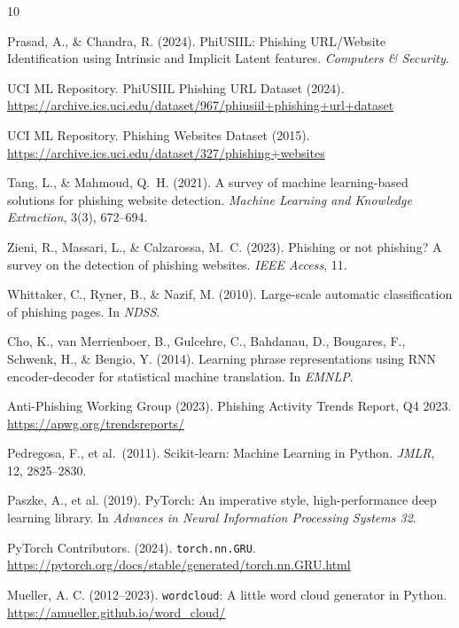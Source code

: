 \documentclass{article}
\begin{document}
\newpage
\begin{thebibliography}{10}
\small

Prasad, A., \& Chandra, R. (2024).
PhiUSIIL: Phishing URL/Website Identification using Intrinsic and Implicit Latent features.
\textit{Computers \& Security}.

UCI ML Repository. PhiUSIIL Phishing URL Dataset (2024).
\url{https://archive.ics.uci.edu/dataset/967/phiusiil+phishing+url+dataset}

UCI ML Repository. Phishing Websites Dataset (2015).
\url{https://archive.ics.uci.edu/dataset/327/phishing+websites}

Tang, L., \& Mahmoud, Q.~H. (2021).
A survey of machine learning-based solutions for phishing website detection.
\textit{Machine Learning and Knowledge Extraction}, 3(3), 672--694.

Zieni, R., Massari, L., \& Calzarossa, M.~C. (2023).
Phishing or not phishing? A survey on the detection of phishing websites.
\textit{IEEE Access}, 11.

Whittaker, C., Ryner, B., \& Nazif, M. (2010).
Large-scale automatic classification of phishing pages.
In \textit{NDSS}.

Cho, K., van Merrienboer, B., Gulcehre, C., Bahdanau, D., Bougares, F., Schwenk, H., \& Bengio, Y. (2014).
Learning phrase representations using RNN encoder-decoder for statistical machine translation.
In \textit{EMNLP}.

Anti-Phishing Working Group (2023).
Phishing Activity Trends Report, Q4 2023.
\url{https://apwg.org/trendsreports/}

Pedregosa, F., et al.\ (2011).
Scikit-learn: Machine Learning in Python.
\textit{JMLR}, 12, 2825--2830.

Paszke, A., et al. (2019). PyTorch: An imperative style, high-performance deep learning library. In \textit{Advances in Neural Information Processing Systems 32}.

PyTorch Contributors. (2024).
\texttt{torch.nn.GRU}.
\url{https://pytorch.org/docs/stable/generated/torch.nn.GRU.html}

Mueller, A. C. (2012--2023).
\texttt{wordcloud}: A little word cloud generator in Python.
\url{https://amueller.github.io/word_cloud/}

\end{thebibliography}
\end{document}
